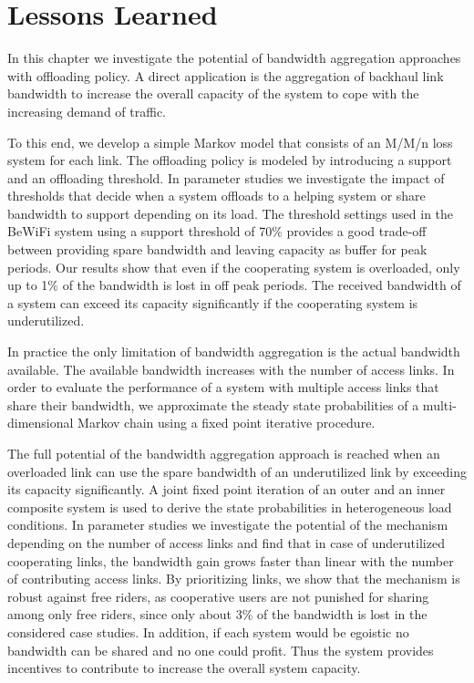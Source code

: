 \section{Lessons Learned}\label{sec:aggregation:lessonslearned}
In this chapter we investigate the potential of bandwidth aggregation approaches with offloading policy.
A direct application is the aggregation of backhaul link bandwidth to increase the overall capacity of the system to cope with the increasing demand of traffic. %

To this end, we develop a simple Markov model that consists of an M/M/n loss system for each link.
The offloading policy is modeled by introducing a support and an offloading threshold.
In parameter studies we investigate the impact of thresholds that decide when a system offloads to a helping system or share bandwidth to support depending on its load.
The threshold settings used in the BeWiFi system using a support threshold of 70\% provides a good trade-off between providing spare bandwidth and leaving capacity as buffer for peak periods.
Our results show that even if the cooperating system is overloaded, only up to 1\% of the bandwidth is lost in off peak periods.
The received bandwidth of a system can exceed its capacity significantly if the cooperating system is underutilized.

In practice the only limitation of bandwidth aggregation is the actual bandwidth available. The available bandwidth increases with the number of access links.
In order to evaluate the performance of a system with multiple access links that share their bandwidth, we approximate the steady state probabilities of a multi-dimensional Markov chain using a fixed point iterative procedure.

The full potential of the bandwidth aggregation approach is reached when an overloaded link can use the spare bandwidth of an underutilized link by exceeding its capacity significantly.
A joint fixed point iteration of an outer and an inner composite system is used to derive the state probabilities in heterogeneous load conditions.
In parameter studies we investigate the potential of the mechanism depending on the number of access links and find that in case of underutilized cooperating links, the bandwidth gain grows faster than linear with the number of contributing access links.
By prioritizing links, we show that the mechanism is robust against free riders, as cooperative users are not punished for sharing among only free riders, since only about 3\% of the bandwidth is lost in the considered case studies.
In addition, if each system would be egoistic no bandwidth can be shared and no one could profit.
Thus the system provides incentives to contribute to increase the overall system capacity.

